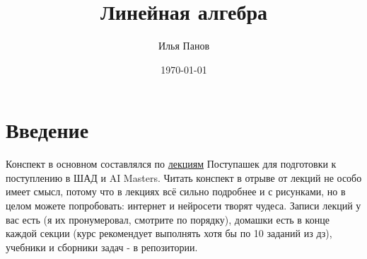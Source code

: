 \documentclass[12pt]{article}
\title{\textbf{\Huge Линейная алгебра}\\}
\author{Илья Панов}
\date{\today}
\begin{document}
\maketitle
\tableofcontents
\newpage







\section{Введение}

Конспект в основном составлялся по \href{https://drive.google.com/drive/folders/1gqBksrkU89tgdOTuxG6GgE3jnozzafNv?usp=sharing}{лекциям} Поступашек для подготовки к поступлению в ШАД и AI Masters. Читать конспект в отрыве от лекций не особо имеет смысл, потому что в лекциях всё сильно подробнее и с рисунками, но в целом можете попробовать: интернет и нейросети творят чудеса. Записи лекций у вас есть (я их пронумеровал, смотрите по порядку), домашки есть в конце каждой секции (курс рекомендует выполнять хотя бы по 10 заданий из дз), учебники и сборники задач - в репозитории.
\end{document}

